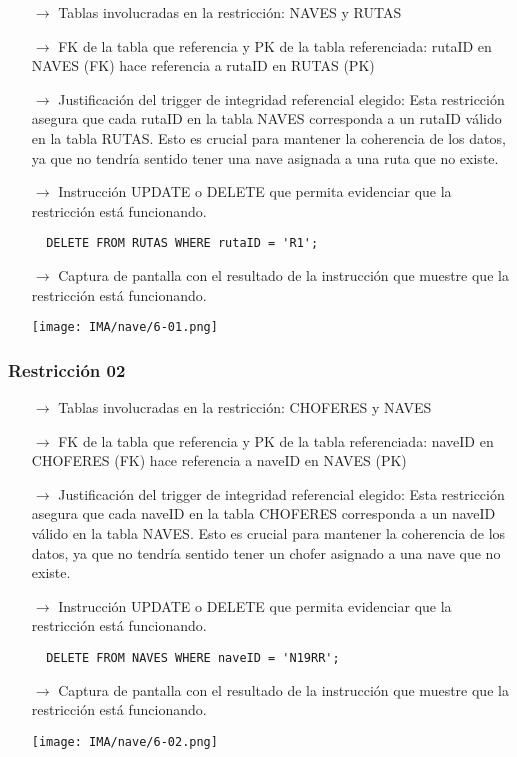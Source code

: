\begin{itemize}
  \item[$\rightarrow$] Tablas involucradas en la restricción: NAVES y RUTAS
  \item[$\rightarrow$] FK de la tabla que referencia y PK de la tabla referenciada: rutaID en NAVES (FK) hace referencia a rutaID en RUTAS (PK)
  \item[$\rightarrow$] Justificación del trigger de integridad referencial elegido: Esta restricción asegura que cada rutaID en la tabla NAVES corresponda a un rutaID válido en la tabla RUTAS. Esto es crucial para mantener la coherencia de los datos, ya que no tendría sentido tener una nave asignada a una ruta que no existe.
  \item[$\rightarrow$] Instrucción UPDATE o DELETE que permita evidenciar que la restricción está funcionando.
  \begin{verbatim}  
  DELETE FROM RUTAS WHERE rutaID = 'R1';  
  \end{verbatim}
  \item[$\rightarrow$] Captura de pantalla con el resultado de la instrucción que muestre que la restricción está funcionando.    
        \begin{center}
            \texttt{[image: IMA/nave/6-01.png]}
        \end{center}

\end{itemize}

\subsubsection*{Restricción 02}

\begin{itemize}
  \item[$\rightarrow$] Tablas involucradas en la restricción: CHOFERES y NAVES
  \item[$\rightarrow$] FK de la tabla que referencia y PK de la tabla referenciada: naveID en CHOFERES (FK) hace referencia a naveID en NAVES (PK)
  \item[$\rightarrow$] Justificación del trigger de integridad referencial elegido: Esta restricción asegura que cada naveID en la tabla CHOFERES corresponda a un naveID válido en la tabla NAVES. Esto es crucial para mantener la coherencia de los datos, ya que no tendría sentido tener un chofer asignado a una nave que no existe.
  \item[$\rightarrow$] Instrucción UPDATE o DELETE que permita evidenciar que la restricción está funcionando.
  \begin{verbatim}
  DELETE FROM NAVES WHERE naveID = 'N19RR';
  \end{verbatim}
  \item[$\rightarrow$] Captura de pantalla con el resultado de la instrucción que muestre que la restricción está funcionando.    
        \begin{center}
          \texttt{[image: IMA/nave/6-02.png]}
        \end{center}

\end{itemize}

